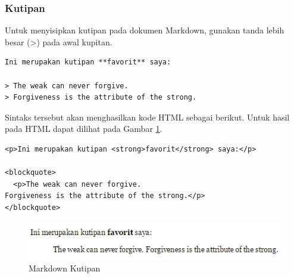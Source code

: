 \subsubsection{Kutipan}
Untuk menyisipkan kutipan pada dokumen Markdown, gunakan tanda lebih besar (>)
pada awal kupitan.
\begin{lstlisting}
Ini merupakan kutipan **favorit** saya:

> The weak can never forgive.
> Forgiveness is the attribute of the strong.
\end{lstlisting}
Sintaks tersebut akan menghasilkan kode HTML sebagai berikut. Untuk
hasil pada HTML dapat dilihat pada Gambar \ref{fig:kutipan}.
\begin{lstlisting}
<p>Ini merupakan kutipan <strong>favorit</strong> saya:</p>

<blockquote>
  <p>The weak can never forgive.
Forgiveness is the attribute of the strong.</p>
</blockquote>
\end{lstlisting}
\begin{figure}[H]
\centering
\includegraphics[scale=1]{Gambar/kutipan.png}
\caption[Markdown Kutipan]{Markdown Kutipan}
\label{fig:kutipan}
\end{figure}

